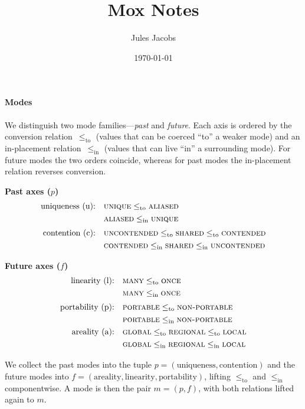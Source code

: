 \documentclass{article}
\title{Mox Notes}
\author{Jules Jacobs}
\date{\today}
\newcommand{\leqto}{\mathrel{\leq_{\mathrm{to}}}}
\newcommand{\leqin}{\mathrel{\leq_{\mathrm{in}}}}
\newcommand{\mode}[1]{\textsc{#1}}
\begin{document}
\maketitle

\paragraph{Modes}

We distinguish two mode families—\emph{past} and \emph{future}.
Each axis is ordered by the conversion relation~$\leqto$ (values that can be coerced ``to'' a weaker mode) and an in-placement relation~$\leqin$ (values that can live ``in'' a surrounding mode).
For future modes the two orders coincide, whereas for past modes the in-placement relation reverses conversion.

\medskip
\noindent\textbf{Past axes ($p$)}
\[
\begin{alignedat}{2}
\text{uniqueness (u):}&\quad \mode{unique} \leqto \mode{aliased}\\
&\quad \mode{aliased} \leqin \mode{unique}\\[0.5ex]
\text{contention (c):}&\quad \mode{uncontended} \leqto \mode{shared} \leqto \mode{contended}\\
&\quad \mode{contended} \leqin \mode{shared} \leqin \mode{uncontended}
\end{alignedat}
\]

\medskip
\noindent\textbf{Future axes ($f$)}
\[
\begin{alignedat}{2}
\text{linearity (l):}&\quad \mode{many} \leqto \mode{once}\\
&\quad \mode{many} \leqin \mode{once}\\[0.5ex]
\text{portability (p):}&\quad \mode{portable} \leqto \mode{non-portable}\\
&\quad \mode{portable} \leqin \mode{non-portable}\\
\text{areality (a):}&\quad \mode{global} \leqto \mode{regional} \leqto \mode{local}\\
&\quad \mode{global} \leqin \mode{regional} \leqin \mode{local}
\end{alignedat}
\]

\medskip                               
We collect the past modes into the tuple $p = (\text{uniqueness}, \text{contention})$ and the future modes into $f = (\text{areality}, \text{linearity}, \text{portability})$, lifting $\leqto$ and $\leqin$ componentwise.
A mode is then the pair $m = (p, f)$, with both relations lifted again to $m$.
\end{document}
